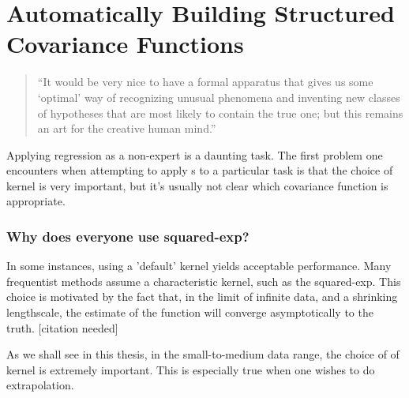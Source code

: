 
\inbpdocument


\chapter{Automatically Building Structured Covariance Functions}
\label{ch:grammar}

\begin{quotation}
``It would be very nice to have a formal apparatus that gives us some `optimal' way of recognizing unusual phenomena and inventing new classes of hypotheses that are most likely to contain the true one; but this remains an art for the creative human mind.''

\hspace*{\fill}
\end{quotation}



Applying \gp{} regression as a non-expert is a daunting task.
The first problem one encounters when attempting to apply \gp{}s to a particular task is that the choice of kernel is very important, but it's usually not clear which covariance function is appropriate.

\subsection{Why does everyone use squared-exp?}
In some instances, using a 'default' kernel yields acceptable performance.
Many frequentist methods assume a characteristic kernel, such as the squared-exp.
This choice is motivated by the fact that, in the limit of infinite data, and a shrinking lengthscale, the estimate of the function will converge asymptotically to the truth. [citation needed]

As we shall see in this thesis, in the small-to-medium data range, the choice of of kernel is extremely important.
This is especially true when one wishes to do extrapolation.




